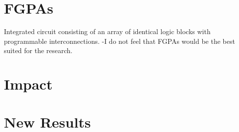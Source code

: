 \section{FGPAs}
Integrated circuit consisting of an array of identical logic blocks with programmable interconnections.
-I do not feel that FGPAs would be the best suited for the research. \cite{roth:2016:dsd}

\section{Impact}

\section{New Results}
